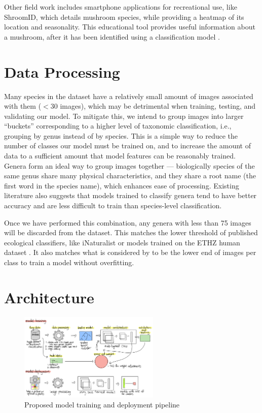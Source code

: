 \documentclass{article} %
\begin{document}
Other field work includes smartphone applications for recreational use, like ShroomID, which details mushroom species, while providing a heatmap of its location and seasonality. This educational tool provides useful information about a mushroom, after it has been identified using a classification model \citep{.ShroomID.2023}.

\section{Data Processing}
\label{data}

Many species in the dataset have a relatively small amount of images associated with them ($<30$ images), which may be detrimental when training, testing, and validating our model. To mitigate this, we intend to group images into larger “buckets” corresponding to a higher level of taxonomic classification, i.e., grouping by genus instead of by species. This is a simple way to reduce the number of classes our model must be trained on, and to increase the amount of data to a sufficient amount that model features can be reasonably trained. Genera form an ideal way to group images together — biologically species of the same genus share many physical characteristics, and they share a root name (the first word in the species name), which enhances ease of processing. Existing literature \citep{HollisterCaiEtAl.UsingComputerVision.2023} also suggests that models trained to classify genera tend to have better accuracy and are less difficult to train than species-level classification.

Once we have performed this combination, any genera with less than 75 images will be discarded from the dataset. This matches the lower threshold of published ecological classifiers, like iNaturalist \citep{Shepard.LatestComputerVision.2022} or models trained on the ETHZ human dataset \citep{SchneiderTaylorEtAl.PresentFutureApproaches.2019}. It also matches what is considered by \cite{FarleyMehrotaEtAl.ImprovingYourModel.2024} to be the lower end of images per class to train a model without overfitting.

\section{Architecture}

\begin{figure}[h]
  \begin{center}
  \includegraphics[width=0.6\textwidth]{figures/model.png}
  \end{center}
  \caption{Proposed model training and deployment pipeline}
\end{figure}
\end{document}
